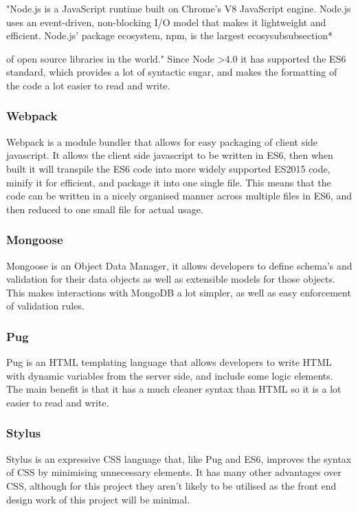 "Node.js is a JavaScript runtime built on Chrome's V8 JavaScript engine. Node.js uses an event-driven, non-blocking I/O model that makes it lightweight and efficient. Node.js' package ecosystem, npm, is the largest ecosysubsubsection*{of open source libraries in the world."\cite{node-org}
    Since Node \textgreater4.0 it has supported the ES6 standard, which provides a lot of syntactic sugar, and makes the formatting of the code a lot easier to read and write. 
    \subsubsection*{Webpack}
    
    Webpack is a module bundler that allows for easy packaging of client side javascript. It allows the client side javascript to be written in ES6, then when built it will transpile the ES6 code into more widely supported ES2015 code, minify it for efficient, and package it into one single file. This means that the code can be written in a nicely organised manner across multiple files in ES6, and then reduced to one small file for actual usage. 

    \subsubsection*{Mongoose}

    Mongoose is an Object Data Manager, it allows developers to define schema's and validation for their data objects as well as extensible models for those objects. This makes interactions with MongoDB a lot simpler, as well as easy enforcement of validation rules.

    \subsubsection*{Pug}

    Pug is an HTML templating language that allows developers to write HTML with dynamic variables from the server side, and include some logic elements. The main benefit is that it has a much cleaner syntax than HTML so it is a lot easier to read and write. 

    \subsubsection*{Stylus}

    Stylus is an expressive CSS language that, like Pug and ES6, improves the syntax of CSS by minimising unnecessary elements. It has many other advantages over CSS, although for this project they aren't likely to be utilised as the front end design work of this project will be minimal. 

}
